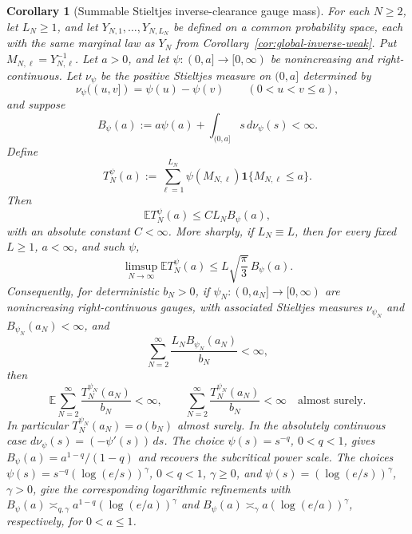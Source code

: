 \documentclass[11pt]{amsart}
\numberwithin{equation}{section}
\newtheorem{corollary}[theorem]{Corollary}
\theoremstyle{definition}
\theoremstyle{remark}
\newcommand{\Exp}{\mathbb E}
\begin{document}
\begin{corollary}[Summable Stieltjes inverse-clearance gauge mass]
\label{cor:global-inverse-family-gauge-sum}
For each \(N\ge2\), let \(L_N\ge1\), and let
\(Y_{N,1},\ldots,Y_{N,L_N}\) be defined on a common probability space, each with
the same marginal law as \(Y_N\) from
Corollary~\ref{cor:global-inverse-weak}.  Put \(M_{N,\ell}=Y_{N,\ell}^{-1}\).
Let \(a>0\), and let \(\psi:(0,a]\to[0,\infty)\) be nonincreasing and
right-continuous.  Let \(\nu_\psi\) be the positive Stieltjes measure on
\((0,a]\) determined by
\[
  \nu_\psi((u,v])=\psi(u)-\psi(v)\qquad(0<u<v\le a),
\]
and suppose
\[
  B_\psi(a):=a\psi(a)+\int_{(0,a]}s\,d\nu_\psi(s)<\infty .
\]
Define
\[
  T_N^\psi(a):=
  \sum_{\ell=1}^{L_N}\psi(M_{N,\ell})\mathbf1\{M_{N,\ell}\le a\}.
\]
Then
\[
  \Exp T_N^\psi(a)\le C L_N B_\psi(a),
\]
with an absolute constant \(C<\infty\).  More sharply, if \(L_N\equiv L\),
then for every fixed \(L\ge1\), \(a<\infty\), and such \(\psi\),
\[
  \limsup_{N\to\infty}\Exp T_N^\psi(a)
  \le
  L\sqrt{\frac{\pi}{3}}\,B_\psi(a).
\]
Consequently, for deterministic \(b_N>0\), if
\(\psi_N:(0,a_N]\to[0,\infty)\) are nonincreasing right-continuous gauges, with
associated Stieltjes measures \(\nu_{\psi_N}\) and \(B_{\psi_N}(a_N)<\infty\),
and
\[
  \sum_{N=2}^\infty
  \frac{L_NB_{\psi_N}(a_N)}{b_N}<\infty,
\]
then
\[
  \Exp\sum_{N=2}^\infty \frac{T_N^{\psi_N}(a_N)}{b_N}<\infty,
  \qquad
  \sum_{N=2}^\infty \frac{T_N^{\psi_N}(a_N)}{b_N}<\infty
  \quad\text{almost surely}.
\]
In particular \(T_N^{\psi_N}(a_N)=o(b_N)\) almost surely.  In the absolutely
continuous case \(d\nu_\psi(s)=(-\psi'(s))\,ds\).  The choice
\(\psi(s)=s^{-q}\), \(0<q<1\), gives
\(B_\psi(a)=a^{1-q}/(1-q)\) and recovers the subcritical power scale.  The
choices \(\psi(s)=s^{-q}(\log(e/s))^\gamma\), \(0<q<1\), \(\gamma\ge0\), and
\(\psi(s)=(\log(e/s))^\gamma\), \(\gamma>0\), give the corresponding logarithmic
refinements with \(B_\psi(a)\asymp_{q,\gamma}a^{1-q}(\log(e/a))^\gamma\) and
\(B_\psi(a)\asymp_\gamma a(\log(e/a))^\gamma\), respectively, for
\(0<a\le1\).
\end{corollary}
\end{document}
